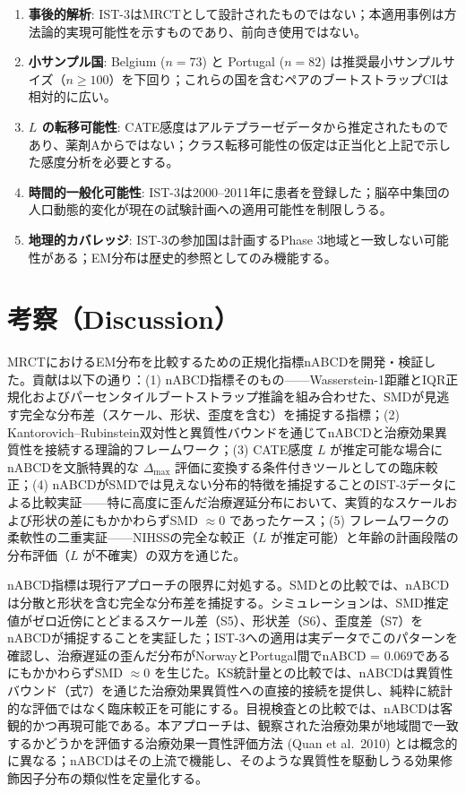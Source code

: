 \documentclass[
  a4paper,
  11pt]{ltjsarticle}
\providecommand{\tightlist}{%
  \setlength{\itemsep}{0pt}\setlength{\parskip}{0pt}}\usepackage{longtable,booktabs,array}
\begin{document}
\begin{enumerate}
\def\labelenumi{\arabic{enumi}.}
\tightlist
\item
  \textbf{事後的解析}:
  IST-3はMRCTとして設計されたものではない；本適用事例は方法論的実現可能性を示すものであり、前向き使用ではない。
\item
  \textbf{小サンプル国}: Belgium (\(n = 73\)) と Portugal (\(n = 82\))
  は推奨最小サンプルサイズ（\(n \geq 100\)）を下回り；これらの国を含むペアのブートストラップCIは相対的に広い。
\item
  \textbf{\(L\) の転移可能性}:
  CATE感度はアルテプラーゼデータから推定されたものであり、薬剤Aからではない；クラス転移可能性の仮定は正当化と上記で示した感度分析を必要とする。
\item
  \textbf{時間的一般化可能性}:
  IST-3は2000--2011年に患者を登録した；脳卒中集団の人口動態的変化が現在の試験計画への適用可能性を制限しうる。
\item
  \textbf{地理的カバレッジ}: IST-3の参加国は計画するPhase
  3地域と一致しない可能性がある；EM分布は歴史的参照としてのみ機能する。
\end{enumerate}

\section{考察（Discussion）}\label{ux8003ux5bdfdiscussion}

MRCTにおけるEM分布を比較するための正規化指標nABCDを開発・検証した。貢献は以下の通り：(1)
nABCD指標そのもの------Wasserstein-1距離とIQR正規化およびパーセンタイルブートストラップ推論を組み合わせた、SMDが見逃す完全な分布差（スケール、形状、歪度を含む）を捕捉する指標；(2)
Kantorovich--Rubinstein双対性と異質性バウンドを通じてnABCDと治療効果異質性を接続する理論的フレームワーク；(3)
CATE感度 \(L\) が推定可能な場合にnABCDを文脈特異的な \(\Delta_{\max}\)
評価に変換する条件付きツールとしての臨床較正；(4)
nABCDがSMDでは見えない分布的特徴を捕捉することのIST-3データによる比較実証------特に高度に歪んだ治療遅延分布において、実質的なスケールおよび形状の差にもかかわらずSMD
\(\approx 0\) であったケース；(5)
フレームワークの柔軟性の二重実証------NIHSSの完全な較正（\(L\)
が推定可能）と年齢の計画段階の分布評価（\(L\) が不確実）の双方を通じた。

nABCD指標は現行アプローチの限界に対処する。SMDとの比較では、nABCDは分散と形状を含む完全な分布差を捕捉する。シミュレーションは、SMD推定値がゼロ近傍にとどまるスケール差（S5）、形状差（S6）、歪度差（S7）をnABCDが捕捉することを実証した；IST-3への適用は実データでこのパターンを確認し、治療遅延の歪んだ分布がNorwayとPortugal間でnABCD
= 0.069であるにもかかわらずSMD \(\approx 0\)
を生じた。KS統計量との比較では、nABCDは異質性バウンド（式7）を通じた治療効果異質性への直接的接続を提供し、純粋に統計的な評価ではなく臨床較正を可能にする。目視検査との比較では、nABCDは客観的かつ再現可能である。本アプローチは、観察された治療効果が地域間で一致するかどうかを評価する治療効果一貫性評価方法
(Quan et al.~2010)
とは概念的に異なる；nABCDはその上流で機能し、そのような異質性を駆動しうる効果修飾因子分布の類似性を定量化する。
\end{document}
